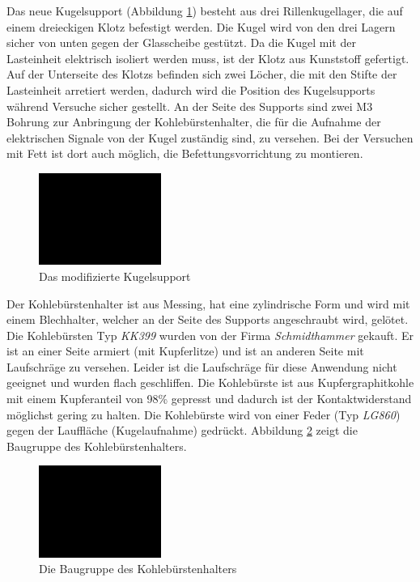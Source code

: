 Das neue Kugelsupport (Abbildung \ref{fig:das_modifizierte_kugelsupport}) besteht aus drei Rillenkugellager, die auf einem dreieckigen Klotz befestigt werden.
Die Kugel wird von den drei Lagern sicher von unten gegen der Glasscheibe gestützt.
Da die Kugel mit der Lasteinheit elektrisch isoliert werden muss, ist der Klotz aus Kunststoff gefertigt.
Auf der Unterseite des Klotzs befinden sich zwei Löcher, die mit den Stifte der Lasteinheit arretiert werden, dadurch wird die Position des Kugelsupports während Versuche sicher gestellt.
An der Seite des Supports sind zwei M3 Bohrung zur Anbringung der Kohlebürstenhalter, die für die Aufnahme der elektrischen Signale von der Kugel zuständig sind, zu versehen.
Bei der Versuchen mit Fett ist dort auch möglich, die Befettungsvorrichtung zu montieren.
\begin{figure}[htb]
    \centering
    \includegraphics[width=4cm]{./images/blank_img.jpg}
    \caption{Das modifizierte Kugelsupport}
    \label{fig:das_modifizierte_kugelsupport}
\end{figure}
%

Der Kohlebürstenhalter ist aus Messing, hat eine zylindrische Form und wird mit einem Blechhalter, welcher an der Seite des Supports angeschraubt wird, gelötet.
Die Kohlebürsten Typ \textit{KK399} wurden von der Firma \textit{Schmidthammer} gekauft.
Er ist an einer Seite armiert (mit Kupferlitze) und ist an anderen Seite mit Laufschräge zu versehen.
Leider ist die Laufschräge für diese Anwendung nicht geeignet und wurden flach geschliffen.
Die Kohlebürste ist aus Kupfergraphitkohle mit einem Kupferanteil von 98\% gepresst und dadurch ist der Kontaktwiderstand möglichst gering zu halten.
Die Kohlebürste wird von einer Feder (Typ \textit{LG860}) gegen der Lauffläche (Kugelaufnahme) gedrückt.
Abbildung \ref{fig:die_baugruppe_des_kohlebuerstenhalters} zeigt die Baugruppe des Kohlebürstenhalters.
\begin{figure}[htb]
    \centering
    \includegraphics[width=4cm]{./images/blank_img.jpg}
    \caption{Die Baugruppe des Kohlebürstenhalters}
    \label{fig:die_baugruppe_des_kohlebuerstenhalters}
\end{figure}
%

